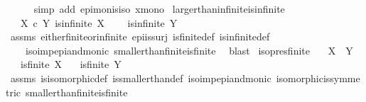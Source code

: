 \begin{isabellebody}
\ \ \ \ \isamarkupfalse%
\ {\isacharparenleft}{\kern0pt}simp\ add{\isacharcolon}{\kern0pt}\ epi{\isacharunderscore}{\kern0pt}mon{\isacharunderscore}{\kern0pt}is{\isacharunderscore}{\kern0pt}iso\ x{\isacharunderscore}{\kern0pt}mono{\isacharparenright}{\kern0pt}\isanewline
{}\isamarkupfalse%
%
\endisatagproof
{\isafoldproof}%
%
\isadelimproof
\isanewline
%
\endisadelimproof
\isanewline
{}\isamarkupfalse%
\ larger{\isacharunderscore}{\kern0pt}than{\isacharunderscore}{\kern0pt}infinite{\isacharunderscore}{\kern0pt}is{\isacharunderscore}{\kern0pt}infinite{\isacharcolon}{\kern0pt}\isanewline
\ \ \ {\isachardoublequoteopen}X\ {\isasymle}\isactrlsub c\ Y{\isachardoublequoteclose}\ {\isachardoublequoteopen}is{\isacharunderscore}{\kern0pt}infinite\ X{\isachardoublequoteclose}\ \isanewline
\ \ \ {\isachardoublequoteopen}is{\isacharunderscore}{\kern0pt}infinite\ Y{\isachardoublequoteclose}\isanewline
%
\isadelimproof
\ \ %
\endisadelimproof
%
\isatagproof
{}\isamarkupfalse%
\ assms\ either{\isacharunderscore}{\kern0pt}finite{\isacharunderscore}{\kern0pt}or{\isacharunderscore}{\kern0pt}infinite\ epi{\isacharunderscore}{\kern0pt}is{\isacharunderscore}{\kern0pt}surj\ is{\isacharunderscore}{\kern0pt}finite{\isacharunderscore}{\kern0pt}def\ is{\isacharunderscore}{\kern0pt}infinite{\isacharunderscore}{\kern0pt}def\isanewline
\ \ \ \ iso{\isacharunderscore}{\kern0pt}imp{\isacharunderscore}{\kern0pt}epi{\isacharunderscore}{\kern0pt}and{\isacharunderscore}{\kern0pt}monic\ smaller{\isacharunderscore}{\kern0pt}than{\isacharunderscore}{\kern0pt}finite{\isacharunderscore}{\kern0pt}is{\isacharunderscore}{\kern0pt}finite\ \isamarkupfalse%
\ blast%
\endisatagproof
{\isafoldproof}%
%
\isadelimproof
\isanewline
%
\endisadelimproof
\isanewline
{}\isamarkupfalse%
\ iso{\isacharunderscore}{\kern0pt}pres{\isacharunderscore}{\kern0pt}finite{\isacharcolon}{\kern0pt}\isanewline
\ \ \ {\isachardoublequoteopen}X\ {\isasymcong}\ Y{\isachardoublequoteclose}\isanewline
\ \ \ {\isachardoublequoteopen}is{\isacharunderscore}{\kern0pt}finite\ X{\isachardoublequoteclose}\isanewline
\ \ \ {\isachardoublequoteopen}is{\isacharunderscore}{\kern0pt}finite\ Y{\isachardoublequoteclose}\isanewline
%
\isadelimproof
\ \ %
\endisadelimproof
%
\isatagproof
{}\isamarkupfalse%
\ assms\ is{\isacharunderscore}{\kern0pt}isomorphic{\isacharunderscore}{\kern0pt}def\ is{\isacharunderscore}{\kern0pt}smaller{\isacharunderscore}{\kern0pt}than{\isacharunderscore}{\kern0pt}def\ iso{\isacharunderscore}{\kern0pt}imp{\isacharunderscore}{\kern0pt}epi{\isacharunderscore}{\kern0pt}and{\isacharunderscore}{\kern0pt}monic\ isomorphic{\isacharunderscore}{\kern0pt}is{\isacharunderscore}{\kern0pt}symmetric\ smaller{\isacharunderscore}{\kern0pt}than{\isacharunderscore}{\kern0pt}finite{\isacharunderscore}{\kern0pt}is{\isacharunderscore}{\kern0pt}finite\ \isamarkupfalse%

\end{isabellebody}
